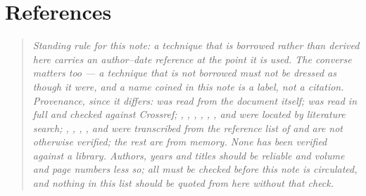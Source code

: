 \documentclass[11pt,a4paper]{article}
\begin{document}
\section*{References}

\begin{quote}
\small\itshape
Standing rule for this note: a technique that is \emph{borrowed} rather than
derived here carries an author--date reference at the point it is used.  The
converse matters too --- a technique that is \emph{not} borrowed must not be
dressed as though it were, and a name coined in this note is a label, not a
citation.  Provenance, since it differs: \cite{mvwe} was read from the document
itself; \cite{tromp1989} was read in full and checked against Crossref; \cite{hisada1994}, \cite{hisada1995}, \cite{luco1983},
\cite{michalski1997}, \cite{haines2004}, \cite{hulme2004}, \cite{thomson2015a} and
\cite{thomson2015b} were located by literature search; \cite{bellman1959},
\cite{chapman1994}, \cite{haines1989}, \cite{hainesdehoop1996},
\cite{kennett1978} and \cite{mccoy1986} were transcribed from the reference
list of \cite{haines2004} and are not otherwise verified; the rest are from
memory.  \emph{None has been verified against a library.}  Authors, years and
titles should be reliable and volume and page numbers less so; all must be
checked before this note is circulated, and nothing in this list should be
quoted from here without that check.
\end{quote}
\end{document}
